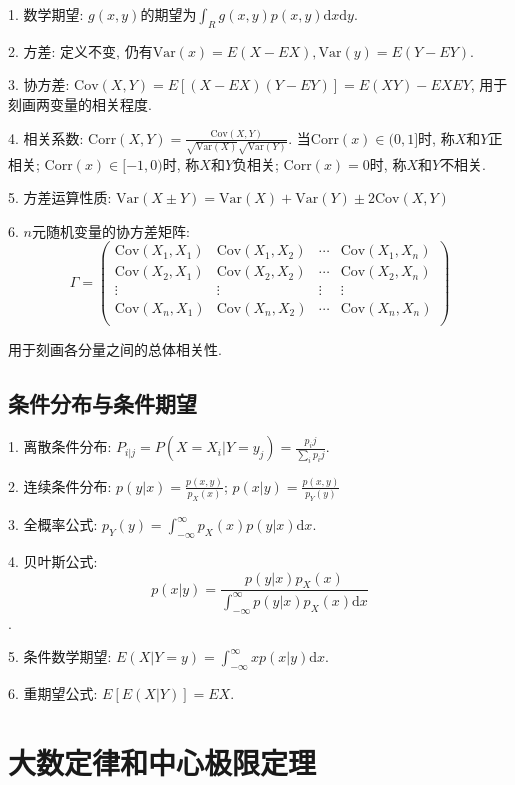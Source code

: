 1. 数学期望: $g(x,y)$的期望为$\int_R g(x,y)p(x,y)\mathrm{d}x\mathrm{d}y$.

2. 方差: 定义不变, 仍有$\text{Var}(x)=E(X-EX),\text{Var}(y)=E(Y-EY)$.

3. 协方差: $\text{Cov}(X,Y)=E[(X-EX)(Y-EY)]=E(XY)-EXEY$, 用于刻画两变量的相关程度.

4. 相关系数: $\text{Corr}(X,Y)=\frac{\text{Cov}(X,Y)}{\sqrt{\text{Var}(X)}\sqrt{\text{Var}(Y)}}$. 当$\text{Corr}(x)\in (0,1]$时, 称$X$和$Y$正相关; $\text{Corr}(x)\in [-1,0)$时, 称$X$和$Y$负相关; $\text{Corr}(x)=0$时, 称$X$和$Y$不相关.

5. 方差运算性质: $\text{Var}(X\pm Y)=\text{Var}(X)+\text{Var}(Y)\pm 2\text{Cov}(X,Y)$

6. $n$元随机变量的协方差矩阵: \begin{equation*}
    \Gamma=\begin{pmatrix}
        \text{Cov}(X_1,X_1) & \text{Cov}(X_1,X_2)&\cdots&\text{Cov}(X_1,X_n)\\
        \text{Cov}(X_2,X_1) & \text{Cov}(X_2,X_2)&\cdots&\text{Cov}(X_2,X_n)\\
        \vdots &\vdots &\vdots &\vdots \\
        \text{Cov}(X_n,X_1) & \text{Cov}(X_n,X_2)&\cdots&\text{Cov}(X_n,X_n)\\
    \end{pmatrix}
\end{equation*}

用于刻画各分量之间的总体相关性.

\subsection{条件分布与条件期望}

1. 离散条件分布: $P_{i|j}=P(X=X_i|Y=y_j)=\frac{p_ij}{\sum\limits_i p_ij}$.

2. 连续条件分布: $p(y|x)=\frac{p(x,y)}{p_X(x)}$; $p(x|y)=\frac{p(x,y)}{p_Y(y)}$ 

3. 全概率公式: $p_Y(y)=\int_{-\infty}^\infty p_X(x)p(y|x)\mathrm{d}x$.

4. 贝叶斯公式: \begin{equation*}
    p(x|y)=\frac{p(y|x)p_X(x)}{\int_{-\infty}^\infty p(y|x)p_X(x)\mathrm{d}x}
\end{equation*}.

5. 条件数学期望: $E(X|Y=y)=\int_{-\infty}^\infty xp(x|y)\mathrm{d}x$.

6. 重期望公式: $E[E(X|Y)]=EX$.

\section{大数定律和中心极限定理}

